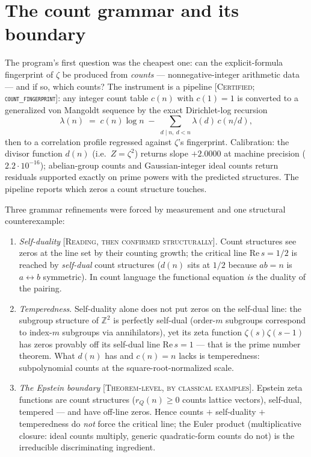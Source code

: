 \documentclass[11pt,reqno]{amsart}
\theoremstyle{plain}
\theoremstyle{definition}
\theoremstyle{remark}
\newcommand{\Z}{\mathbb{Z}}
\newcommand{\grade}[1]{\textup{[\textsc{#1}]}}
\begin{document}
\section{The count grammar and its boundary}\label{sec:grammar}

The program's first question was the cheapest one: can the explicit-formula fingerprint of
$\zeta$ be produced from \emph{counts} --- nonnegative-integer arithmetic data --- and if so,
which counts? The instrument is a pipeline \grade{Certified; \texttt{count\_\allowbreak fingerprint}}:
any integer count table $c(n)$ with $c(1) = 1$ is converted to a generalized von Mangoldt
sequence by the exact Dirichlet-log recursion
\[
\lambda(n) \;=\; c(n)\log n \;-\; \sum_{d \mid n,\ d < n} \lambda(d)\, c(n/d),
\]
then to a correlation profile regressed against $\zeta$'s fingerprint. Calibration: the
divisor function $d(n)$ (i.e.\ $Z = \zeta^2$) returns slope $+2.0000$ at machine precision
($2.2\cdot10^{-16}$); abelian-group counts and Gaussian-integer ideal counts return residuals
supported exactly on prime powers with the predicted structures. The pipeline reports which
zeros a count structure touches.

Three grammar refinements were forced by measurement and one structural counterexample:

\begin{enumerate}
\item \emph{Self-duality} \grade{Reading, then confirmed structurally}. Count structures see
zeros at the line set by their counting growth; the critical line $\mathrm{Re}\,s = 1/2$ is
reached by \emph{self-dual} count structures ($d(n)$ sits at $1/2$ because $ab = n$ is
$a \leftrightarrow b$ symmetric). In count language the functional equation \emph{is} the
duality of the pairing.
\item \emph{Temperedness}. Self-duality alone does not put zeros on the self-dual line:
the subgroup structure of $\Z^2$ is perfectly self-dual (order-$m$ subgroups correspond to
index-$m$ subgroups via annihilators), yet its zeta function $\zeta(s)\zeta(s-1)$ has zeros
provably off its self-dual line $\mathrm{Re}\,s = 1$ --- that is the prime number theorem.
What $d(n)$ has and $c(n) = n$ lacks is temperedness: subpolynomial counts at the
square-root-normalized scale.
\item \emph{The Epstein boundary} \grade{Theorem-level, by classical examples}. Epstein zeta
functions are count structures ($r_Q(n) \ge 0$ counts lattice vectors), self-dual, tempered
--- and have off-line zeros. Hence counts $+$ self-duality $+$ temperedness do \emph{not}
force the critical line; the Euler product (multiplicative closure: ideal counts multiply,
generic quadratic-form counts do not) is the irreducible discriminating ingredient.
\end{enumerate}
\end{document}
